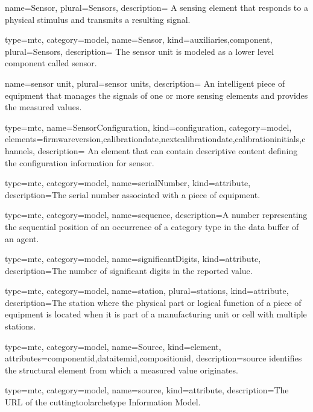 {
  name={Sensor},
  plural={Sensors},
  description= {A \gls{sensing element} that responds to a physical stimulus and transmits a resulting signal.}
}


{
  type=mtc,
  category=model,
  name={Sensor},
  kind={auxiliaries,component},
  plural={Sensors},
  description= {The \gls{sensor unit} is modeled as a \gls{lower level} \gls{component} called \gls{sensor}.}
}


{
  name={sensor unit},
  plural={sensor units},
  description= {An intelligent piece of equipment that manages the signals of one or more \glspl{sensing element} and provides the measured values.}
}


{
  type=mtc,
  name={SensorConfiguration},
  kind={configuration},
  category=model,
  elements={\gls{firmwareversion},\gls{calibrationdate},\gls{nextcalibrationdate},\gls{calibrationinitials},\gls{channels}},
  description= {An element that can contain descriptive content defining the configuration information for \gls{sensor}.}
}


{
  type=mtc,
  category=model,
  name={serialNumber},
  kind={attribute},
  description={The serial number associated with a piece of equipment. }
}


{
  type=mtc,
  category=model,
  name={sequence},
  description={A number representing the sequential position of an occurrence of a \gls{category} type in the data buffer of an \gls{agent}. }
}


{
  type=mtc,
  category=model,
  name={significantDigits},
  kind={attribute},
  description={The number of significant digits in the reported value.}
}


{
  type=mtc,
  category=model,
  name={station},
  plural={stations},
  kind={attribute},
  description={The station where the physical part or logical function of a piece of equipment is located when it is part of a manufacturing unit or cell with multiple stations.}
}


{
  type=mtc,
  category=model,
  name={Source},
  kind={element},
  attributes={\gls{componentid},\gls{dataitemid},\gls{compositionid}},
  description={\gls{source} identifies the \gls{structural element} from which a measured value originates.}
}

{
  type=mtc,
  category=model,
  name={source},
  kind={attribute},
  description={The URL of the \gls{cuttingtoolarchetype} Information Model.}
}

